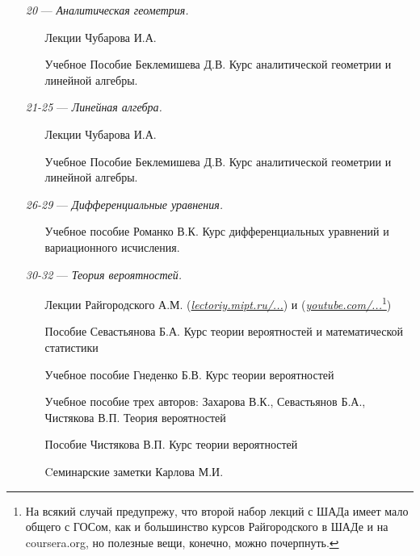 \begin{itemize}
\item[\textit{20}] 
\; --- \: \textit{Аналитическая геометрия.}
\begin{itemize}
\item[\textbullet]
Лекции Чубарова И.А. 
\item[\textbullet]
Учебное Пособие Беклемишева Д.В. \glqq Курс аналитической геометрии и линейной алгебры\grqq.
\end{itemize}

\item[\textit{21-25}] 
\; --- \: \textit{Линейная алгебра.}
\begin{itemize}
\item[\textbullet]
Лекции Чубарова И.А. 
\item[\textbullet]
Учебное Пособие Беклемишева Д.В. \glqq Курс аналитической геометрии и линейной алгебры\grqq.
\end{itemize}

\item[\textit{26-29}] 
\; --- \: \textit{Дифференциальные уравнения.}
\begin{itemize}
\item[\textbullet] 
Учебное пособие Романко В.К. \glqq Курс дифференциальных уравнений и вариационного исчисления\grqq.
\end{itemize}

\item[\textit{30-32}]
\; --- \: \textit{Теория вероятностей.}
\begin{itemize}
\item[\textbullet]
Лекции Райгородского А.М. (\href{http://lectoriy.mipt.ru/course/Maths-ProbabilityTheoryBasics-L15}{\textit{lectoriy.mipt.ru/...}}) и (\href{https://www.youtube.com/playlist?list=PLJOzdkh8T5kouOIbZDCqzB72hBn9T7gsJ}{\textit{youtube.com/...}\footnote{На всякий случай предупрежу, что второй набор лекций с ШАДа имеет мало общего с ГОСом, как и большинство курсов Райгородского в ШАДе и на coursera.org, но полезные вещи, конечно, можно почерпнуть.}})
\item[\textbullet]
Пособие Севастьянова Б.А. \glqq Курс теории вероятностей и математической статистики\grqq
\item[\textbullet]
Учебное пособие Гнеденко Б.В. \glqq Курс теории вероятностей\grqq
\item [\textbullet]
Учебное пособие трех авторов: Захарова В.К., Севастьянов Б.А., Чистякова В.П. \glqq Теория вероятностей\grqq
\item[\textbullet]
Пособие Чистякова В.П. \glqq Курс теории вероятностей\grqq
\item[\textbullet]
Cеминарские заметки Карлова М.И.
\end{itemize}


\end{itemize}
